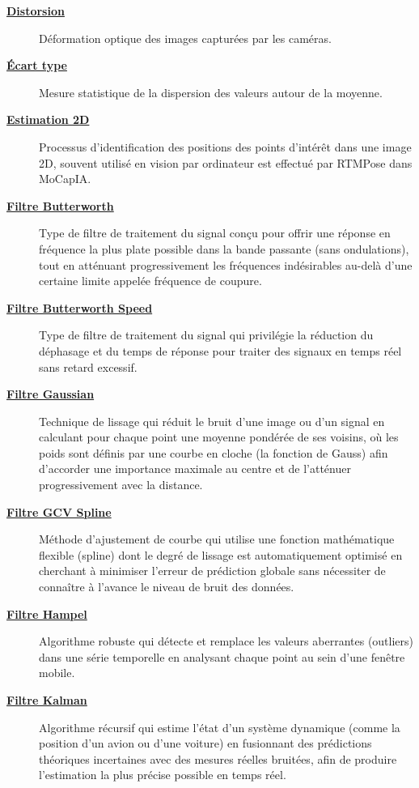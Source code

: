 \begin{description}
    \item[\textbf{\underline{Distorsion}}] 
    Déformation optique des images capturées par les caméras.

    \item[\textbf{\underline{Écart type}}] 
    Mesure statistique de la dispersion des valeurs autour de la moyenne.

    \item[\textbf{\underline{Estimation 2D}}] 
    Processus d'identification des positions des points d'intérêt dans une image 2D, souvent utilisé en vision par ordinateur est effectué par RTMPose dans MoCapIA.

    \item[\textbf{\underline{Filtre Butterworth}}] 
    Type de filtre de traitement du signal conçu pour offrir une réponse en fréquence la plus plate possible dans la bande passante (sans ondulations), tout en atténuant progressivement les fréquences indésirables au-delà d'une certaine limite appelée fréquence de coupure.

    \item[\textbf{\underline{Filtre Butterworth Speed}}] 
    Type de filtre de traitement du signal qui privilégie la réduction du déphasage et du temps de réponse pour traiter des signaux en temps réel sans retard excessif.

    \item[\textbf{\underline{Filtre Gaussian}}] 
    Technique de lissage qui réduit le bruit d'une image ou d'un signal en calculant pour chaque point une moyenne pondérée de ses voisins, où les poids sont définis par une courbe en cloche (la fonction de Gauss) afin d'accorder une importance maximale au centre et de l'atténuer progressivement avec la distance.

    \item[\textbf{\underline{Filtre GCV Spline}}] 
    Méthode d'ajustement de courbe qui utilise une fonction mathématique flexible (spline) dont le degré de lissage est automatiquement optimisé en cherchant à minimiser l'erreur de prédiction globale sans nécessiter de connaître à l'avance le niveau de bruit des données.

    \item[\textbf{\underline{Filtre Hampel}}] 
    Algorithme robuste qui détecte et remplace les valeurs aberrantes (outliers) dans une série temporelle en analysant chaque point au sein d'une fenêtre mobile.

    \item[\textbf{\underline{Filtre Kalman}}] 
    Algorithme récursif qui estime l'état d'un système dynamique (comme la position d'un avion ou d'une voiture) en fusionnant des prédictions théoriques incertaines avec des mesures réelles bruitées, afin de produire l'estimation la plus précise possible en temps réel.


\end{description}
